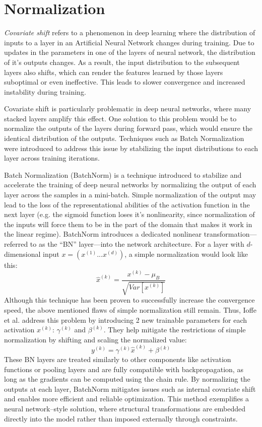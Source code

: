 \section{Normalization}
\label{subsec:normalization}

\begin{definition}
  \textit{Covariate shift} \autocite{ioffe2015batch} refers to a phenomenon in deep learning where the distribution of inputs to a layer in an Artificial Neural Network changes during training. Due to updates in the parameters in one of the layers of neural network, the distribution of it's outputs changes. As a result, the input distribution to the subsequent layers also shifts, which can render the features learned by those layers suboptimal or even ineffective. This leads to slower convergence and increased instability during training.
\end{definition}

Covariate shift is particularly problematic in deep neural networks, where many stacked layers amplify this effect. One solution to this problem would be to normalize the outputs of the layers during forward pass, which would ensure the identical distribution of the outputs. Techniques such as Batch Normalization \autocite{ioffe2015batch} were introduced to address this issue by stabilizing the input distributions to each layer across training iterations.

Batch Normalization (BatchNorm) \autocite{ioffe2015batch} is a technique introduced to stabilize and accelerate the training of deep neural networks by normalizing the output of each layer across the samples in a mini-batch. Simple normalization of the output may lead to the loss of the representational abilities of the activation function in the next layer (e.g. the sigmoid function loses it's nonlinearity, since normalization of the inputs will force them to be in the part of the domain that makes it work in the linear regime). BatchNorm introduces a dedicated nonlinear transformation—referred to as the “BN” layer—into the network architecture. For a layer with $d$-dimensional input $x = (x^{(1)}...x^{(d)})$, a simple normalization would look like this:
\[
  \hat{x}^{(k)} = \frac{x^{(k)} - \mu_B}{\sqrt{Var[x^{(k)}]}}
\]
Although this technique has been proven to successfully increase the convergence speed, the above mentioned flaws of simple normalization still remain. Thus, Ioffe et al. \autocite{ioffe2015batch} address this problem by introducing 2 new trainable parameters for each activation $x^{(k)}$: $\gamma^{(k)}$ and $\beta^{(k)}$. They help mitigate the restrictions of simple normalization by shifting and scaling the normalized value:
\[
  y^{(k)} = \gamma^{(k)} \hat{x}^{(k)} + \beta^{(k)}
\]
These BN layers are treated similarly to other components like activation functions or pooling layers and are fully compatible with backpropagation, as long as the gradients can be computed using the chain rule. By normalizing the outputs at each layer, BatchNorm mitigates issues such as internal covariate shift and enables more efficient and reliable optimization. This method exemplifies a neural network–style solution, where structural transformations are embedded directly into the model rather than imposed externally through constraints.